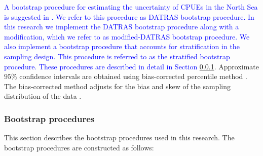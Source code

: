 \documentclass[a4paper 12pt]{article}
\numberwithin{equation}{section}
\newcommand{\ed}[1]{\textcolor{red}{#1}}
\newcommand{\nat}[1]{\textcolor{blue}{#1}}
\begin{document}
\nat{A bootstrap procedure for estimating the uncertainty of CPUEs in the North Sea is suggested in \citet{ICES2006Report}. We refer to this procedure as DATRAS bootstrap procedure. In this research we implement the DATRAS bootstrap procedure along with a modification, which we refer to as modified-DATRAS bootstrap procedure. We also implement a bootstrap procedure that accounts for stratification in the sampling design. This procedure is referred to as the stratified bootstrap procedure. These procedures are described in detail in Section \ref{sec:datrasstratifiedbootstrap}}. Approximate $95\%$ confidence intervals are obtained using bias-corrected percentile method  \citep{carpenter2000bootstrap}. The bias-corrected method adjusts for the bias and skew of the sampling distribution of the data \citep{puth2015variety, karlsson2009bootstrap}. 


\subsubsection{Bootstrap procedures}
\label{sec:datrasstratifiedbootstrap}
This section describes the bootstrap procedures used in this research. The bootstrap procedures are constructed as follows:

\end{document}
